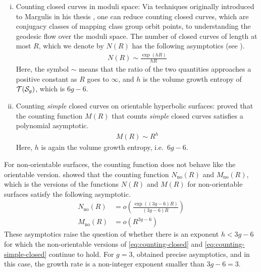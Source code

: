 \begin{enumerate}[(i)]
\item Counting closed curves in moduli space: Via techniques originally introduced to Margulis in his thesis \cite{margulis2004some}, one can reduce counting closed curves, which are conjugacy classes of mapping class group orbit points, to understanding the geodesic flow over the moduli space.
  The number of closed curves of length at most $R$, which we denote by $N(R)$ has the following asymptotics (see \cite{eskinmirzakhani}).
  \begin{align}
    \label{eq:counting-closed}
    N(R) \sim \frac{\exp(hR)}{hR}
  \end{align}
  Here, the symbol $\sim$ means that the ratio of the two quantities approaches a positive constant as $R$ goes to $\infty$, and $h$ is the volume growth entropy of $\mathcal{T}(\mathcal{S}_{g})$, which is $6g-6$.
\item Counting \emph{simple} closed curves on orientable hyperbolic surfaces: \textcite{mirzakhani2008growth} proved that the counting function $M(R)$ that counts \emph{simple} closed curves satisfies a polynomial asymptotic.
  \begin{align}
    \label{eq:counting-simple-closed}
    M(R) \sim R^{h}
  \end{align}
  Here, $h$ is again the volume growth entropy, i.e.\ $6g-6$.
\end{enumerate}

For non-orientable surfaces, the counting function does not behave like the orientable version.
\textcite{gendulphe2017whats} showed that the counting function $N_{\mathrm{no}}(R)$ and $M_{\mathrm{no}}(R)$, which is the versions of the functions $N(R)$ and $M(R)$ for non-orientable surfaces satisfy the following asymptotic.
\begin{align*}
  N_{\mathrm{no}}(R) &= o\left( \frac{\exp((3g-6)R)}{(3g-6)R} \right) \\
  M_{\mathrm{no}}(R) &= o(R^{3g-6})
\end{align*}
These asymptotics raise the question of whether there is an exponent $h < 3g-6$ for which the non-orientable versions of \eqref{eq:counting-closed} and \eqref{eq:counting-simple-closed} continue to hold.
For $g = 3$, \textcite{10.1093/imrn/rny112} obtained precise asymptotics, and in this case, the growth rate is a non-integer exponent smaller than $3g - 6 = 3$.

